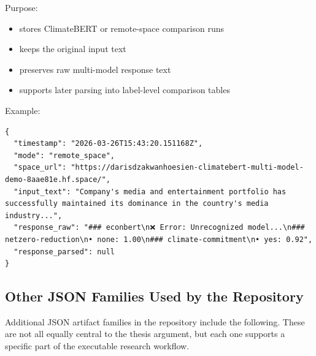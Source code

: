 \documentclass[12pt,a4paper]{report}
\providecommand{\tightlist}{\setlength{\itemsep}{0pt}\setlength{\parskip}{0pt}}
\begin{document}
Purpose:

\begin{itemize}
\tightlist
\item
  stores ClimateBERT or remote-space comparison runs
\item
  keeps the original input text
\item
  preserves raw multi-model response text
\item
  supports later parsing into label-level comparison tables
\end{itemize}

Example:

\begin{verbatim}
{
  "timestamp": "2026-03-26T15:43:20.151168Z",
  "mode": "remote_space",
  "space_url": "https://darisdzakwanhoesien-climatebert-multi-model-demo-8aae81e.hf.space/",
  "input_text": "Company's media and entertainment portfolio has successfully maintained its dominance in the country's media industry...",
  "response_raw": "### econbert\n❌ Error: Unrecognized model...\n### netzero-reduction\n• none: 1.00\n### climate-commitment\n• yes: 0.92",
  "response_parsed": null
}
\end{verbatim}

\subsection{Other JSON Families Used by the Repository}\label{other-json-families-used-by-the-repository}

Additional JSON artifact families in the repository include the following. These are not all equally central to the thesis argument, but each one supports a specific part of the executable research workflow.
\end{document}
